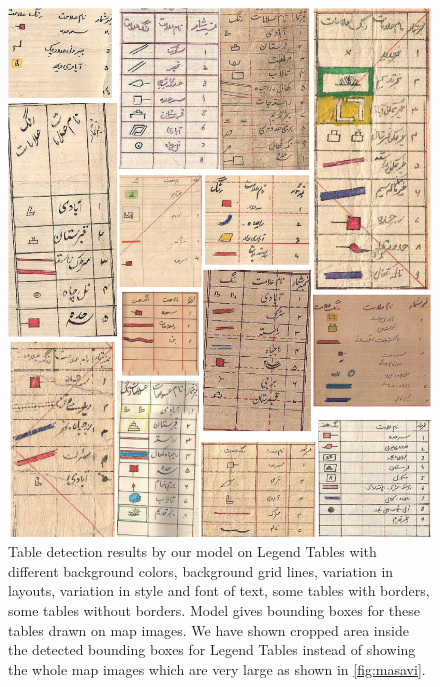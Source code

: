 \begin{figure}[h!]
    \centering
    \includegraphics[width=\linewidth, angle=0]{legendTables.pdf}
    \caption{Table detection results by our model on Legend Tables with different background colors, background grid lines, variation in layouts, variation in style and font of text, some tables with borders, some tables without borders. Model gives bounding boxes for these tables drawn on map images. We have shown cropped area inside the detected bounding boxes for Legend Tables instead of showing the whole map images which are very large as shown in \autoref{fig:masavi}.}
    \label{fig:legendTables}
\end{figure}
